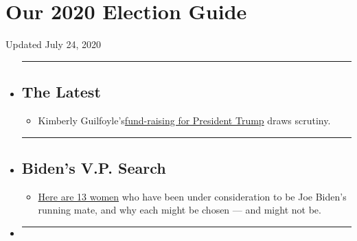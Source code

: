 \hypertarget{our-2020-election-guide}{%
\section{Our 2020 Election Guide}\label{our-2020-election-guide}}

Updated July 24, 2020

\begin{itemize}
\item
  \begin{center}\rule{0.5\linewidth}{\linethickness}\end{center}

  \hypertarget{the-latest}{%
  \subsection{The Latest}\label{the-latest}}

  \begin{itemize}
  \tightlist
  \item
    Kimberly
    Guilfoyle's\href{https://www.nytimes3xbfgragh.onion/2020/07/24/us/politics/kimberly-guilfoyles-trump-fundraising.html?action=click\&pgtype=Article\&state=default\&module=styln-elections-2020\&region=BELOW_MAIN_CONTENT\&context=storylines_guide}{}\href{https://www.nytimes3xbfgragh.onion/2020/07/24/us/politics/kimberly-guilfoyles-trump-fundraising.html?action=click\&pgtype=Article\&state=default\&module=styln-elections-2020\&region=BELOW_MAIN_CONTENT\&context=storylines_guide}{fund-raising
    for President Trump} draws scrutiny.
  \end{itemize}
\item
  \begin{center}\rule{0.5\linewidth}{\linethickness}\end{center}

  \hypertarget{bidens-vp-search}{%
  \subsection{Biden's V.P. Search}\label{bidens-vp-search}}

  \begin{itemize}
  \tightlist
  \item
    \href{https://www.nytimes3xbfgragh.onion/article/biden-vice-president-2020.html?action=click\&pgtype=Article\&state=default\&module=styln-elections-2020\&region=BELOW_MAIN_CONTENT\&context=storylines_guide}{Here
    are 13 women} who have been under consideration to be Joe Biden's
    running mate, and why each might be chosen --- and might not be.
  \end{itemize}
\item
  \begin{center}\rule{0.5\linewidth}{\linethickness}\end{center}


\end{itemize}
